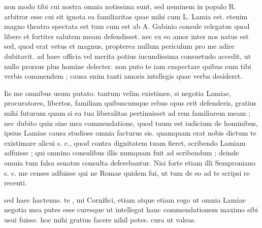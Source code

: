


 non modo tibi cui nostra omnia notissima sunt, sed neminem in populo R. arbitror esse cui sit ignota ea familiaritas quae mihi cum L. Lamia est. etenim magno theatro spectata est tum cum est ab A. Gabinio consule relegatus quod libere et fortiter salutem meam defendisset. nec ex eo amor inter nos natus est sed, quod erat vetus et magnus, propterea nullum periculum pro me adire dubitavit. ad haec officia vel merita potius iucundissima consuetudo accedit, ut nullo prorsus plus homine delecter. non puto te iam exspectare quibus eum tibi verbis commendem ; causa enim tanti amoris intellegis quae verba desideret.

 Iis me omnibus usum putato. tantum velim existimes, si negotia Lamiae, procuratores, libertos, familiam quibuscumque rebus opus erit defenderis, gratius mihi futurum quam si ea tua liberalitas pertinuisset ad rem familiarem meam ; nec dubito quin sine mea commendatione, quod tuum est iudicium de hominibus, ipsius Lamiae causa studiose omnia facturus sis. quamquam erat nobis dictum te existimare alicui s. c., quod contra dignitatem tuam fieret, scribendo Lamiam adfuisse ; qui omnino consulibus illis numquam fuit ad scribendum ; deinde omnia tum falsa senatus consulta deferebantur. Nisi forte etiam illi Semproniano s. c. me censes adfuisse qui ne Romae quidem fui, ut tum de eo ad te scripsi re recenti.

 sed haec hactenus. te , mi Cornifici, etiam atque etiam rogo ut omnia Lamiae negotia mea putes esse curesque ut intellegat hanc commendationem maximo sibi usui fuisse. hoc mihi gratius facere nihil potes. cura ut valeas.
